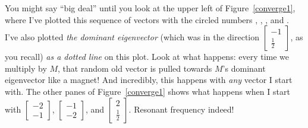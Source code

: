 You might say ``big deal'' until you look at the upper left of
Figure~\ref{converge1}, where I've plotted this sequence of vectors with the
circled numbers , , , and . I've also
plotted \textit{the dominant eigenvector} (which was in the direction
{\footnotesize $\begin{bmatrix} -1 \\ \frac{1}{2} \end{bmatrix}$}, as you
recall) \textit{as a dotted line} on this plot. Look at what happens: every
time we multiply by $M$, that random old vector is pulled towards $M$'s
dominant eigenvector like a magnet! And incredibly, this happens with
\textit{any} vector I start with. The other panes of Figure~\ref{converge1}
shows what happens when I start with {\footnotesize $\begin{bmatrix} -2 \\ -1
\end{bmatrix}$}, {\footnotesize $\begin{bmatrix} -1 \\ -2 \end{bmatrix}$}, and
{\footnotesize $\begin{bmatrix} 2 \\ \frac{1}{2} \end{bmatrix}$}. Resonant
frequency indeed!

